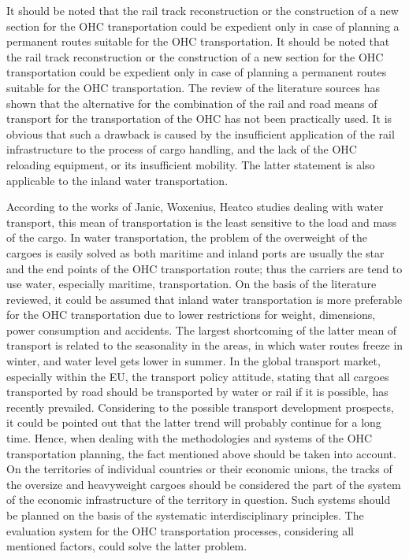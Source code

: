 It should be noted that the rail track reconstruction or the construction of a new section for the OHC transportation could be expedient only in case of planning a permanent routes suitable for the OHC transportation. 
 It should be noted that the rail track reconstruction or the construction of a new section for the OHC transportation could be expedient only in case of planning a permanent routes suitable for the OHC transportation. The review of the literature sources has shown that the alternative for the combination of the rail and road means of transport for the transportation of the OHC has not been practically used. It is obvious that such a drawback is caused by the insufficient application of the rail infrastructure to the process of cargo handling, and the lack of the OHC reloading equipment, or its insufficient mobility. The latter statement is also applicable to the inland water transportation.

According to the works of Janic, Woxenius, Heatco studies dealing with water transport, this mean of transportation is the least sensitive to the load and mass of the cargo. In water transportation, the problem of the overweight of the cargoes is easily solved as both maritime and inland ports are usually the star and the end points of the OHC transportation route; thus the carriers are tend to use water, especially maritime, transportation. On the basis of the literature reviewed, it could be assumed that inland water transportation is more preferable for the OHC transportation due to lower restrictions for weight, dimensions, power consumption and accidents. The largest shortcoming of the latter mean of transport is related to the seasonality in the areas, in which water routes freeze in winter, and water level gets lower in summer. In the global transport market, especially within the EU, the transport policy attitude, stating that all cargoes transported by road should be transported by water or rail if it is possible, has recently prevailed. Considering to the possible transport development prospects, it could be pointed out that the latter trend will probably continue for a long time. Hence, when dealing with the methodologies and systems of the OHC transportation planning, the fact mentioned above should be taken into account. On the territories of individual countries or their economic unions, the tracks of the oversize and heavyweight cargoes should be considered the part of the system of the economic infrastructure of the territory in question. Such systems should be planned on the basis of the systematic interdisciplinary principles. The evaluation system for the OHC transportation processes, considering all mentioned factors, could solve the latter problem. 